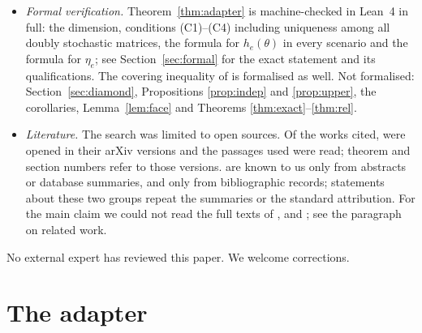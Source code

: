 \documentclass[11pt]{amsart}
\theoremstyle{plain}
\theoremstyle{definition}
\theoremstyle{remark}
\begin{document}
\begin{itemize}
  integer-scaled matrices. Formula \eqref{eq:eta} was confirmed for $n=2,3$ over all corner scenarios, the formula in
  the proof of Corollary~\ref{cor:np} for all graphs on at most three vertices, and the reduction in the proof of
  Corollary~\ref{cor:inapx} on $250$ random instances (two implementations). Proposition~\ref{prop:indep} was
  checked by enumeration on $400$ random instances with $N\le4$, Corollary~\ref{cor:tw} (dimension and value formula)
  on $10$ instances with $n\le4$. With a floating-point linear programming solver: the inequalities of
  Theorem~\ref{thm:rel} for $n\le6$; the two programs in the proof of Proposition~\ref{prop:upper} on $40$ random
  graphs, with the exact forced value at the maximising scenario; and, for $n=2,3$, the fixed polyhedron with $4n^2$
  inequalities. These computations are consistency checks, not proofs.
\item \emph{Formal verification.} Theorem~\ref{thm:adapter} is machine-checked in Lean~4 in full: the dimension,
  conditions \textup{(C1)--(C4)} including uniqueness among all doubly stochastic matrices, the formula for
  $h_e(\theta)$ in every scenario and the formula for $\eta_e$; see Section~\ref{sec:formal} for the exact statement
  and its qualifications. The covering inequality of \cite{KW} is formalised as well. Not formalised:
  Section~\ref{sec:diamond}, Propositions \ref{prop:indep} and \ref{prop:upper}, the corollaries,
  Lemma~\ref{lem:face} and Theorems \ref{thm:exact}--\ref{thm:rel}.
\item \emph{Literature.} The search was limited to open sources. Of the works cited,
  \cite{AFHMS,ABTW,BHKL,BFPS,BPmatching,BPZ,Cela,CLRS,FMPTW,GJW,HL,HuSotirov,JKR,KW,Kovac,MR,MS,RT} were opened in their arXiv
  versions and the passages used were read; theorem and section numbers refer to those versions.
  \cite{ABV,CW,DPSW,Fortin,GJM,Hladik11,Hladik12,Hladik26,KZ,LinWen,Rostami,YZ} are known to us only from abstracts
  or database summaries, and \cite{BM,BP13,GJS,GMO,GW,HM,Karp,SLG,Wendell,Yannakakis} only from bibliographic
  records; statements about these two groups repeat the summaries or the standard attribution. For the main claim
  we could not read the full texts of \cite{Hladik26}, \cite{KZ} and \cite{Fortin}; see the paragraph on related
  work.
\end{itemize}
No external expert has reviewed this paper. We welcome corrections.

\section{The adapter}\label{sec:adapter}
\end{document}
